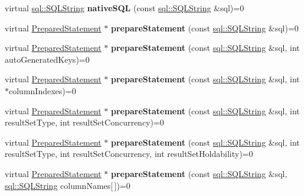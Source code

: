 \begin{DoxyCompactItemize}
virtual \hyperlink{classsql_1_1_s_q_l_string}{sql\+::\+S\+Q\+L\+String} {\bfseries native\+S\+QL} (const \hyperlink{classsql_1_1_s_q_l_string}{sql\+::\+S\+Q\+L\+String} \&sql)=0
\item 
\hypertarget{classsql_1_1_connection_ad30808d0dffd8cfc6046ed2b688a2d75}{}\label{classsql_1_1_connection_ad30808d0dffd8cfc6046ed2b688a2d75} 
virtual \hyperlink{classsql_1_1_prepared_statement}{Prepared\+Statement} $\ast$ {\bfseries prepare\+Statement} (const \hyperlink{classsql_1_1_s_q_l_string}{sql\+::\+S\+Q\+L\+String} \&sql)=0
\item 
\hypertarget{classsql_1_1_connection_aafe50678f73e87ad3f59e9700f9247cd}{}\label{classsql_1_1_connection_aafe50678f73e87ad3f59e9700f9247cd} 
virtual \hyperlink{classsql_1_1_prepared_statement}{Prepared\+Statement} $\ast$ {\bfseries prepare\+Statement} (const \hyperlink{classsql_1_1_s_q_l_string}{sql\+::\+S\+Q\+L\+String} \&sql, int auto\+Generated\+Keys)=0
\item 
\hypertarget{classsql_1_1_connection_a449be4e4c10b0702d14afa481a63b838}{}\label{classsql_1_1_connection_a449be4e4c10b0702d14afa481a63b838} 
virtual \hyperlink{classsql_1_1_prepared_statement}{Prepared\+Statement} $\ast$ {\bfseries prepare\+Statement} (const \hyperlink{classsql_1_1_s_q_l_string}{sql\+::\+S\+Q\+L\+String} \&sql, int $\ast$column\+Indexes)=0
\item 
\hypertarget{classsql_1_1_connection_aa79514a7f216651ea19698ab2ca9521e}{}\label{classsql_1_1_connection_aa79514a7f216651ea19698ab2ca9521e} 
virtual \hyperlink{classsql_1_1_prepared_statement}{Prepared\+Statement} $\ast$ {\bfseries prepare\+Statement} (const \hyperlink{classsql_1_1_s_q_l_string}{sql\+::\+S\+Q\+L\+String} \&sql, int result\+Set\+Type, int result\+Set\+Concurrency)=0
\item 
\hypertarget{classsql_1_1_connection_a76955dcf34e7bfa21b57a58f468d401a}{}\label{classsql_1_1_connection_a76955dcf34e7bfa21b57a58f468d401a} 
virtual \hyperlink{classsql_1_1_prepared_statement}{Prepared\+Statement} $\ast$ {\bfseries prepare\+Statement} (const \hyperlink{classsql_1_1_s_q_l_string}{sql\+::\+S\+Q\+L\+String} \&sql, int result\+Set\+Type, int result\+Set\+Concurrency, int result\+Set\+Holdability)=0
\item 
\hypertarget{classsql_1_1_connection_a242367d9e97f36cfa8aef7df4ab78c0b}{}\label{classsql_1_1_connection_a242367d9e97f36cfa8aef7df4ab78c0b} 
virtual \hyperlink{classsql_1_1_prepared_statement}{Prepared\+Statement} $\ast$ {\bfseries prepare\+Statement} (const \hyperlink{classsql_1_1_s_q_l_string}{sql\+::\+S\+Q\+L\+String} \&sql, \hyperlink{classsql_1_1_s_q_l_string}{sql\+::\+S\+Q\+L\+String} column\+Names\mbox{[}$\,$\mbox{]})=0

\end{DoxyCompactItemize}
